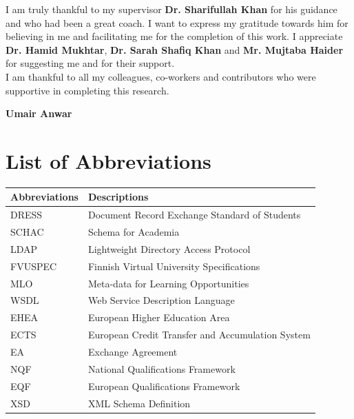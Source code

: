 \documentclass[12pt,a4paper,oneside]{book}
\begin{document}
I am truly thankful to my supervisor {\bfseries Dr. Sharifullah Khan} for his guidance and who had been a great coach. I want to express my gratitude towards him for believing in me and facilitating me for the completion of this work. I appreciate {\bfseries Dr. Hamid Mukhtar}, {\bfseries Dr. Sarah Shafiq Khan} and {\bfseries Mr. Mujtaba Haider} for suggesting me and for their support. \\

I am thankful to all my colleagues, co-workers and contributors who were supportive in completing this research.

\begin{flushright} \textbf{Umair Anwar} \end{flushright}

\tableofcontents
%
%
%
\chapter*{List of Abbreviations}

\begin{table}[h]
    \renewcommand{\arraystretch}{1.3}
    \label{table:table1}
     \begin{tabular}{ll}
        \hline\hline
            {\bfseries Abbreviations} & {\bfseries Descriptions} \\
            \hline                                      %
            DRESS & Document Record Exchange Standard of Students  \\
            SCHAC & Schema for Academia  \\
            LDAP & Lightweight Directory Access Protocol \\
            FVUSPEC & Finnish Virtual University Specifications  \\
            MLO & Meta-data for Learning Opportunities  \\
            WSDL & Web Service Description Language  \\
            EHEA & European Higher Education Area  \\
            ECTS & European Credit Transfer and Accumulation System  \\
            EA & Exchange Agreement  \\
            NQF & National Qualifications Framework  \\
            EQF & European Qualifications Framework  \\
            XSD & XML Schema Definition  \\
            \hline                          %
    \end{tabular}
\end{table}
\end{document}
